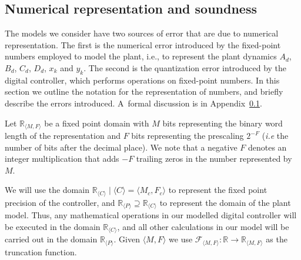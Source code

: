 \documentclass[sigconf]{llncs}
\begin{document}
\subsection{Numerical representation and soundness} 
\label{sec:numeric_rep}

The models we consider have two sources of error that are due to numerical  
representation.  The first is the numerical error introduced by the
fixed-point numbers employed to model the plant, i.e., to represent the
plant dynamics $A_d$, $B_d$, $C_d$, $D_d$, $x_k$ and $y_k$.
The second is the quantization error
introduced by the digital controller, which performs operations on
fixed-point numbers.  In this section we outline the notation for the
representation of numbers, and briefly describe the errors
introduced.  A~formal discussion is in
Appendix~\ref{sec:numeric_rep}.

Let $\mathbb{R}_{\langle M,F \rangle}$ be a fixed point domain with $M$ bits
representing the binary word length of the representation and $F$ bits
representing the prescaling $2^{-F}$ (\emph{i.e} the number of bits after
the decimal place).  We note that a negative $F$ denotes an integer
multiplication that adds $-F$ trailing zeros in the number represented by
$M$.

We will use the domain $\mathbb{R}_{\langle C \rangle} \mid \langle C \rangle = \langle M_c,F_c \rangle$
to represent the fixed point precision of the controller, and 
$\mathbb{R}_{\langle P \rangle} \supseteq \mathbb{R}_{\langle C \rangle}$
to represent the domain of the plant model.
Thus, any mathematical operations in our modelled digital controller will be executed in the
domain $\mathbb{R}_{\langle C \rangle}$, and all other calculations
in our model will be carried out in the domain $\mathbb{R}_{\langle P \rangle}$.
Given ${\langle M,F \rangle}$ we use $\mathcal{F}_{\langle M,F \rangle} : \mathbb{R} \rightarrow \mathbb{R}_{\langle M,F \rangle}$ as the truncation function.
\end{document}

